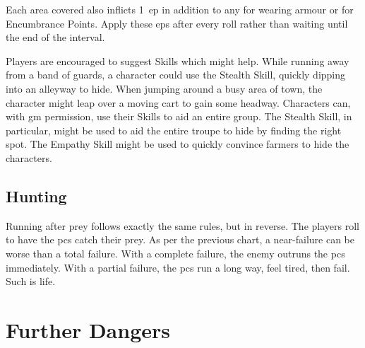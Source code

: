 \begin{multicols}{2}
Each \gls{area} covered also inflicts 1~\gls{ep} in addition to any for wearing armour or for Encumbrance Points.
Apply these \glspl{ep} after every roll rather than waiting until the end of the \gls{interval}.

Players are encouraged to suggest Skills which might help.
While running away from a band of guards, a character could use the Stealth Skill, quickly dipping into an alleyway to hide.
When jumping around a busy area of town, the character might leap over a moving cart to gain some headway.
Characters can, with \gls{gm} permission, use their Skills to aid an entire group.
The Stealth Skill, in particular, might be used to aid the entire troupe to hide by finding the right spot.
The Empathy Skill might be used to quickly convince farmers to hide the characters.

\subsection{Hunting}

Running after prey follows exactly the same rules, but in reverse.
The players roll to have the \glspl{pc} catch their prey.
As per the previous chart, a near-failure can be worse than a total failure.
With a complete failure, the enemy outruns the \glspl{pc} immediately.
With a partial failure, the \glspl{pc} run a long way, feel tired, then fail.
Such is life.

\end{multicols}

\huntchart

\section{Further Dangers}


